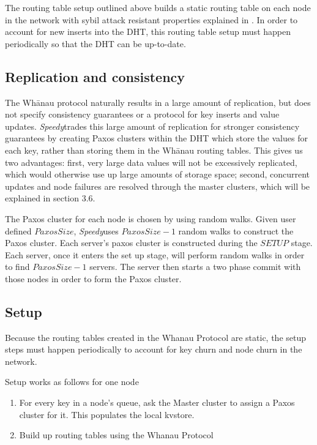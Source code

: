 \documentclass[letter]{article}
\newcommand{\sys}{\textit{Speedy}\space}
\begin{document}
The routing table setup outlined above builds a static routing table on each node in the network with sybil attack resistant properties explained in \cite{whanau}. In order to account for new inserts into the DHT, this routing table setup must happen periodically so that the DHT can be up-to-date.

\subsection{Replication and consistency}

The Wh\={a}nau protocol naturally results in a large amount of replication,
but does not specify consistency guarantees or a protocol for key inserts
and value updates. \sys trades this large amount of replication for
stronger consistency guarantees by creating Paxos clusters within
the DHT which store the values for each key, rather than storing them
in the Wh\={a}nau routing tables. This gives us two advantages: first,
very large data values will not be excessively replicated, which would
otherwise use up large amounts of storage space; second, concurrent
updates and node failures are resolved through the master clusters, which will be
explained in section 3.6.

The Paxos cluster for each node is chosen by using random walks. Given user defined
${PaxosSize}$, \sys uses ${PaxosSize-1}$ random walks to construct the Paxos cluster.
Each server's paxos cluster is constructed during the $SETUP$ stage. Each server,
once it enters the set up stage, will perform random walks in order to find $PaxosSize-1$
servers. The server then starts a two phase commit with those nodes in order to form
the Paxos cluster.

\subsection{Setup}
Because the routing tables created in the Whanau Protocol are static, the setup steps must happen periodically to account for key churn and node churn in the network.

Setup works as follows for one node
\begin{enumerate}
\item For every key in a node's queue, ask the Master cluster to assign a Paxos cluster for it. This populates the local kvstore.
\item Build up routing tables using the Whanau Protocol
\end{enumerate}
\end{document}
